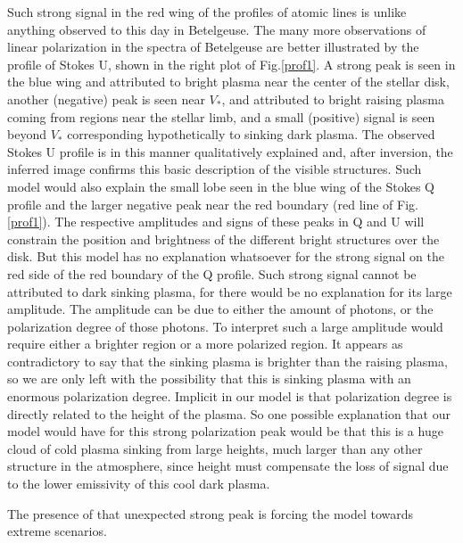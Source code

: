 \documentclass{/Users/art2/TeX/aanda/aa}
\begin{document}
Such strong signal in the red wing of the profiles of atomic lines is unlike anything observed  to this day in Betelgeuse. The many more observations of  linear polarization in the spectra of Betelgeuse are better illustrated by the profile of Stokes U, shown in  the right plot of Fig.\ref{prof1}. A strong peak is seen in the blue wing and attributed to bright plasma near the center of the stellar disk, another (negative) peak is seen near $V_*$, and attributed to bright  raising plasma coming from regions near the stellar limb, and a small   (positive) signal is seen beyond $V_*$ corresponding hypothetically  to sinking dark plasma. The observed Stokes U profile is in this manner qualitatively explained and, after inversion, the inferred image confirms this basic description of the visible structures. Such model would also explain the small lobe seen in the blue wing of the Stokes Q profile and the larger negative peak near the red boundary (red line of Fig. \ref{prof1}). The respective amplitudes and signs of these peaks in Q and U will constrain the position and brightness of the different bright structures over the disk. But this model has no explanation whatsoever for the strong signal on the red side of the red boundary of the Q profile. Such strong signal cannot be attributed to dark sinking plasma, for there would be no explanation for its large amplitude. The amplitude can be due to either the amount of photons, or the polarization degree of those photons. To interpret such a large amplitude would require either a brighter region or a more polarized region. It appears as contradictory to say that the sinking plasma is brighter than the raising plasma, so we are only left with the possibility that this is sinking plasma with an enormous polarization degree. Implicit in our model is that polarization degree is directly related to the height of the plasma. So one possible explanation that our model would have for this strong polarization peak would be that this is a huge cloud of cold plasma sinking from large heights, much larger than any other structure in the atmosphere, since height must compensate the loss of signal due to the lower emissivity of this cool dark plasma.

The presence of that unexpected strong peak is forcing the model towards extreme scenarios.  
\end{document}
